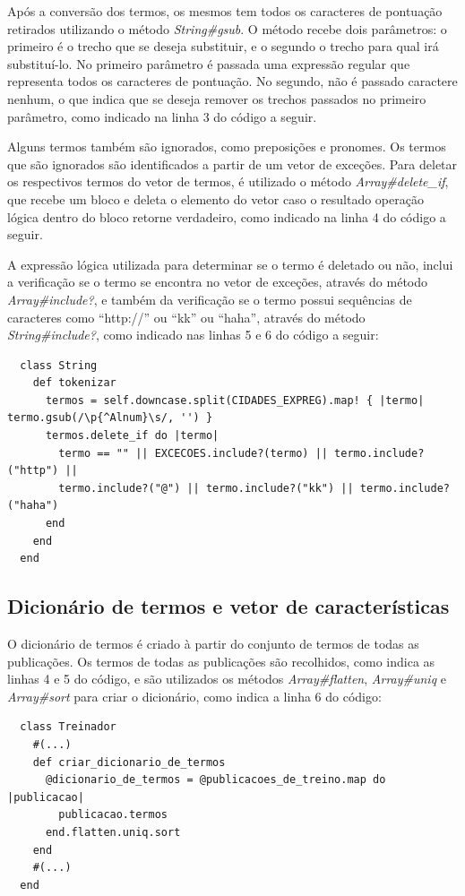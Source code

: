 Após a conversão dos termos, os mesmos tem todos os caracteres de pontuação retirados utilizando o método \textit{String\#gsub}. O método recebe dois parâmetros: o primeiro é o trecho que se deseja substituir, e o segundo o trecho para qual irá substituí-lo. No primeiro parâmetro é passada uma expressão regular que representa todos os caracteres de pontuação. No segundo, não é passado caractere nenhum, o que indica que se deseja remover os trechos passados no primeiro parâmetro, como indicado na linha 3 do código a seguir.

Alguns termos também são ignorados, como preposições e pronomes. Os termos que são ignorados são identificados a partir de um vetor de exceções. Para deletar os respectivos termos do vetor de termos, é utilizado o método \textit{Array\#delete\_if}, que recebe um bloco e deleta o elemento do vetor caso o resultado operação lógica dentro do bloco retorne verdadeiro, como indicado na linha 4 do código a seguir.

A expressão lógica utilizada para determinar se o termo é deletado ou não, inclui a verificação se o termo se encontra no vetor de exceções, através do método \textit{Array\#include?}, e também da verificação se o termo possui sequências de caracteres como ``http://'' ou ``kk'' ou ``haha'', através do método \textit{String\#include?}, como indicado nas linhas 5 e 6 do código a seguir:

\begin{lstlisting}
  class String
    def tokenizar
      termos = self.downcase.split(CIDADES_EXPREG).map! { |termo| termo.gsub(/\p{^Alnum}\s/, '') }
      termos.delete_if do |termo| 
        termo == "" || EXCECOES.include?(termo) || termo.include?("http") || 
        termo.include?("@") || termo.include?("kk") || termo.include?("haha")
      end
    end
  end
\end{lstlisting}

\subsection*{Dicionário de termos e vetor de características}

O dicionário de termos é criado à partir do conjunto de termos de todas as publicações. Os termos de todas as publicações são recolhidos, como indica as linhas 4 e 5 do código, e são utilizados os métodos \textit{Array\#flatten}, \textit{Array\#uniq} e \textit{Array\#sort} para criar o dicionário, como indica a linha 6 do código:

\begin{lstlisting}
  class Treinador
    #(...)
    def criar_dicionario_de_termos
      @dicionario_de_termos = @publicacoes_de_treino.map do |publicacao| 
        publicacao.termos
      end.flatten.uniq.sort
    end
    #(...)
  end
\end{lstlisting}

